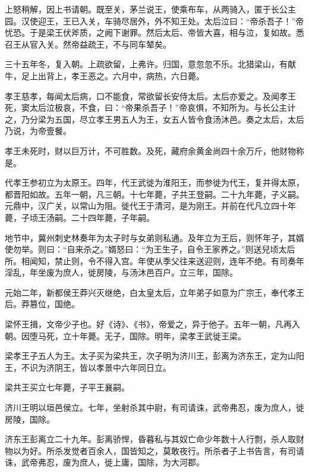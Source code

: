 \documentclass[12pt,UTF8]{ctexbook}
\begin{document}
上怒稍解，因上书请朝。既至关，茅兰说王，使乘布车，从两骑入，匿于长公主园。汉使迎王，王已入关，车骑尽居外，外不知王处。太后泣曰：“帝杀吾子！”帝忧恐。于是梁王伏斧质，之阙下谢罪。然后太后、帝皆大喜，相与泣，复如故。悉召王从官入关。然帝益疏王，不与同车辇矣。



三十五年冬，复入朝。上疏欲留，上弗许。归国，意忽忽不乐。北猎梁山，有献牛，足上出背上，孝王恶之。六月中，病热，六日薨。



孝王慈孝，每闻太后病，口不能食，常欲留长安侍太后。太后亦爱之。及闻孝王死，窦太后泣极哀，不食，曰：“帝果杀吾子！”帝哀惧，不知所为。与长公主计之，乃分梁为五国，尽立孝王男五人为王，女五人皆令食汤沐邑。奏之太后，太后乃说，为帝壹餐。



孝王未死时，财以巨万计，不可胜数。及死，藏府余黄金尚四十余万斤，他财物称是。



代孝王参初立为太原王。四年，代王武徙为淮阳王，而参徙为代王，复并得太原，都晋阳如故。五年一朝，凡三朝。十七年薨，子共王登嗣。二十九年薨，子义嗣。元鼎中，汉广关，以常山为阻。徙代王于清河，是为刚王。并前在代凡立四十年薨，子顷王汤嗣。二十四年薨，子年嗣。



地节中，冀州刺史林奏年为太子时与女弟则私通。及年立为王后，则怀年子，其婿使勿举。则曰：“自来杀之。”婿怒曰：“为王生子，自令王家养之。”则送兒顷太后所。相闻知，禁止则，令不得入宫。年使从季父往来送迎则，连年不绝。有司奏年淫乱，年坐废为庶人，徙房陵，与汤沐邑百户。立三年，国除。



元始二年，新都侯王莽兴灭继绝，白太皇太后，立年弟子如意为广宗王，奉代孝王后。莽篡位，国绝。



梁怀王揖，文帝少子也。好《诗》、《书》，帝爱之，异于他子。五年一朝，凡再入朝。因堕马死，立十年薨。无子，国除。明年，梁孝王武徙王梁。



梁孝王子五人为王。太子买为梁共王，次子明为济川王，彭离为济东王，定为山阳王，不识为济阴王，皆以孝景中六年同日立。



梁共王买立七年薨，子平王襄嗣。



济川王明以垣邑侯立。七年，坐射杀其中尉，有司请诛，武帝弗忍，废为庶人，徙房陵，国除。



济东王彭离立二十九年。彭离骄悍，昏暮私与其奴亡命少年数十人行剽，杀人取财物以为好。所杀发觉者百余人，国皆知之，莫敢夜行。所杀者子上书告言，有司请诛，武帝弗忍，废为庶人，徙上庸，国除，为大河郡。
\end{document}
